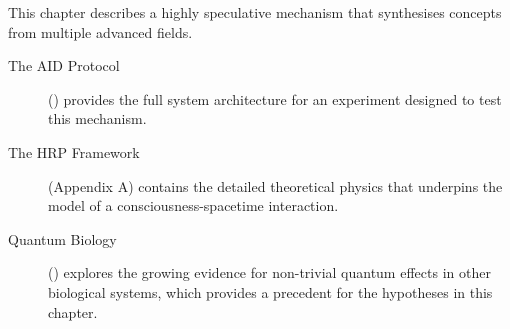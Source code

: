\begin{importantbox}[title={Further Reading}]
    This chapter describes a highly speculative mechanism that synthesises concepts from multiple advanced fields.
    \begin{description}
        \item[The AID Protocol] () provides the full system architecture for an experiment designed to test this mechanism.
        \item[The HRP Framework] (Appendix A) contains the detailed theoretical physics that underpins the model of a consciousness-spacetime interaction.
        \item[Quantum Biology] () explores the growing evidence for non-trivial quantum effects in other biological systems, which provides a precedent for the hypotheses in this chapter.
    \end{description}
\end{importantbox}